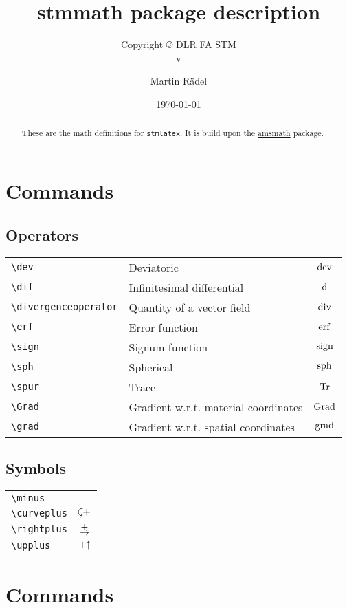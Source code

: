 \documentclass[%
  type=article,%
  layout=koma,%
  date=true,%
  hyperref=true,%
  listings=true,%
  math=true,%
]{stmtext}
\author{Martin R\"{a}del}
\title{stmmath package description}
\subtitle{Copyright \copyright{} \the\year{} DLR FA STM\\v\formatdate[versiondatestyle]{\DTMToday}}
\date{\today}
\begin{document}
\maketitle

\begin{abstract}
These are the math definitions for \texttt{stmlatex}. It is build upon the \href{https://ctan.org/pkg/amsmath}{amsmath} package.
\end{abstract}

\tableofcontents

\section{Commands}

\subsection{Operators}

\begin{tabularx}{\linewidth}{lXc}
\verb+\dev+ & Deviatoric & $\operatorname{dev}$\\
\verb+\dif+ & Infinitesimal differential & $\mathop{}\!\mathrm{d}$\\
\verb+\divergenceoperator+ & Quantity of a vector field & $\operatorname{div}$\\
\verb+\erf+ & Error function & $\operatorname{erf}$\\
\verb+\sign+ & Signum function & $\operatorname{sign}$\\
\verb+\sph+ & Spherical & $\operatorname{sph}$\\
\verb+\spur+ & Trace & $\operatorname{Tr}$\\
\verb+\Grad+ & Gradient w.r.t. material coordinates & $\operatorname{Grad}$\\
\verb+\grad+ & Gradient w.r.t. spatial coordinates & $\operatorname{grad}$
\end{tabularx}

\subsection{Symbols}

\begin{tabularx}{\linewidth}{Xc}
\verb+\minus+ & $\minus$\\
\verb+\curveplus+ & $\curveplus$\\
\verb+\rightplus+ & $\rightplus$\\
\verb+\upplus+ & $\mathbin{+\mathord\uparrow}$
\end{tabularx}

\section{Commands}
\end{document}

